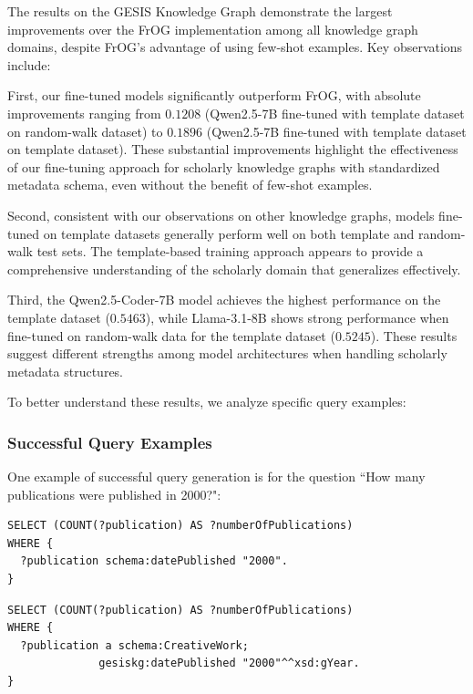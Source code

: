 The results on the GESIS Knowledge Graph demonstrate the largest improvements over the FrOG implementation among all knowledge graph domains, despite FrOG's advantage of using few-shot examples. Key observations include:

First, our fine-tuned models significantly outperform FrOG, with absolute improvements ranging from $0.1208$ (Qwen2.5-7B fine-tuned with template dataset on random-walk dataset) to $0.1896$ (Qwen2.5-7B fine-tuned with template dataset on template dataset). These substantial improvements highlight the effectiveness of our fine-tuning approach for scholarly knowledge graphs with standardized metadata schema, even without the benefit of few-shot examples.

Second, consistent with our observations on other knowledge graphs, models fine-tuned on template datasets generally perform well on both template and random-walk test sets. The template-based training approach appears to provide a comprehensive understanding of the scholarly domain that generalizes effectively.

Third, the Qwen2.5-Coder-7B model achieves the highest performance on the template dataset ($0.5463$), while Llama-3.1-8B shows strong performance when fine-tuned on random-walk data for the template dataset ($0.5245$). These results suggest different strengths among model architectures when handling scholarly metadata structures.

To better understand these results, we analyze specific query examples:

\subsubsection{Successful Query Examples}
One example of successful query generation is for the question ``How many publications were published in 2000?":

\begin{lstlisting}[language=SPARQL, caption=Our Template Fine-tuned Model Output for Publications Count, label=code:gesis-pub-finetuned]
SELECT (COUNT(?publication) AS ?numberOfPublications)
WHERE {
  ?publication schema:datePublished "2000".
}
\end{lstlisting}

\begin{lstlisting}[language=SPARQL, caption=Our Base Model Output for Publications Count, label=code:gesis-pub-base]
SELECT (COUNT(?publication) AS ?numberOfPublications)
WHERE {
  ?publication a schema:CreativeWork;
              gesiskg:datePublished "2000"^^xsd:gYear.
}
\end{lstlisting}

